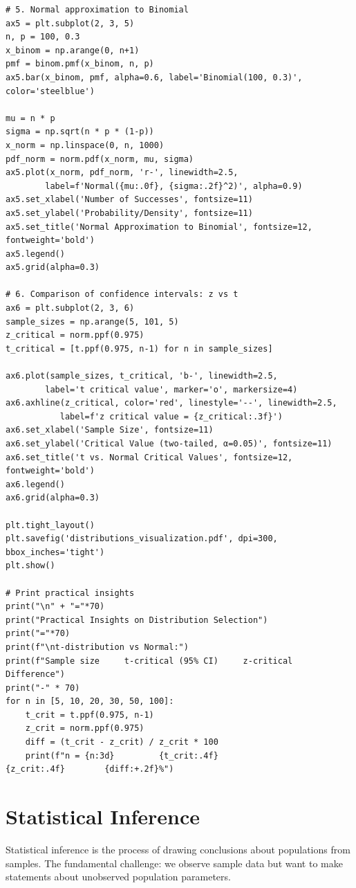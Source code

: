 \begin{lstlisting}
# 5. Normal approximation to Binomial
ax5 = plt.subplot(2, 3, 5)
n, p = 100, 0.3
x_binom = np.arange(0, n+1)
pmf = binom.pmf(x_binom, n, p)
ax5.bar(x_binom, pmf, alpha=0.6, label='Binomial(100, 0.3)', color='steelblue')

mu = n * p
sigma = np.sqrt(n * p * (1-p))
x_norm = np.linspace(0, n, 1000)
pdf_norm = norm.pdf(x_norm, mu, sigma)
ax5.plot(x_norm, pdf_norm, 'r-', linewidth=2.5,
        label=f'Normal({mu:.0f}, {sigma:.2f}^2)', alpha=0.9)
ax5.set_xlabel('Number of Successes', fontsize=11)
ax5.set_ylabel('Probability/Density', fontsize=11)
ax5.set_title('Normal Approximation to Binomial', fontsize=12, fontweight='bold')
ax5.legend()
ax5.grid(alpha=0.3)

# 6. Comparison of confidence intervals: z vs t
ax6 = plt.subplot(2, 3, 6)
sample_sizes = np.arange(5, 101, 5)
z_critical = norm.ppf(0.975)
t_critical = [t.ppf(0.975, n-1) for n in sample_sizes]

ax6.plot(sample_sizes, t_critical, 'b-', linewidth=2.5,
        label='t critical value', marker='o', markersize=4)
ax6.axhline(z_critical, color='red', linestyle='--', linewidth=2.5,
           label=f'z critical value = {z_critical:.3f}')
ax6.set_xlabel('Sample Size', fontsize=11)
ax6.set_ylabel('Critical Value (two-tailed, α=0.05)', fontsize=11)
ax6.set_title('t vs. Normal Critical Values', fontsize=12, fontweight='bold')
ax6.legend()
ax6.grid(alpha=0.3)

plt.tight_layout()
plt.savefig('distributions_visualization.pdf', dpi=300, bbox_inches='tight')
plt.show()

# Print practical insights
print("\n" + "="*70)
print("Practical Insights on Distribution Selection")
print("="*70)
print(f"\nt-distribution vs Normal:")
print(f"Sample size     t-critical (95% CI)     z-critical     Difference")
print("-" * 70)
for n in [5, 10, 20, 30, 50, 100]:
    t_crit = t.ppf(0.975, n-1)
    z_crit = norm.ppf(0.975)
    diff = (t_crit - z_crit) / z_crit * 100
    print(f"n = {n:3d}         {t_crit:.4f}                {z_crit:.4f}        {diff:+.2f}%")
\end{lstlisting}

\section{Statistical Inference}

Statistical inference is the process of drawing conclusions about populations from samples. The fundamental challenge: we observe sample data but want to make statements about unobserved population parameters.

